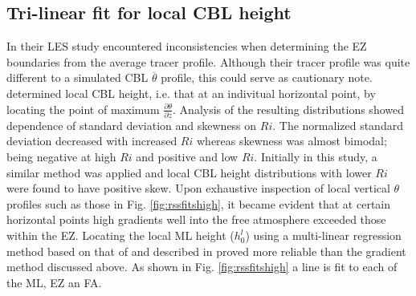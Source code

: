 \subsection{Tri-linear fit for local CBL height}
In their LES study \cite{BrooksFowler2} encountered inconsistencies when determining the EZ boundaries from the average tracer profile.  Although their tracer profile was quite different to a simulated CBL $\overline{\theta}$ profile, this could serve as cautionary note.  \cite{SullMoengStev} determined local CBL height, i.e. that at an indivitual horizontal point, by locating the point of maximum $\frac{\partial \theta}{\partial z}$.  Analysis of the resulting distributions showed dependence of standard deviation and skewness on $Ri$.  The normalized standard deviation decreased with increased $Ri$ whereas skewness was almost bimodal; being negative at high $Ri$ and positive and low $Ri$.  Initially in this study, a similar method was applied and local CBL height distributions with lower $Ri$ were found to have positive skew.  Upon exhaustive inspection of local vertical $\theta$  profiles such as those in Fig. \ref{fig:rssfitshigh}, it became evident that at certain horizontal points high gradients well into the free atmosphere exceeded those within the EZ.  Locating the local ML height ($h^{l}_{0}$) using a multi-linear regression method based on that of \citep{Vieth} and described in \citep{NChap14} proved more reliable than the gradient method discussed above.  As shown in Fig. \ref{fig:rssfitshigh} a line is fit to each of the ML, EZ an FA.\\
  
